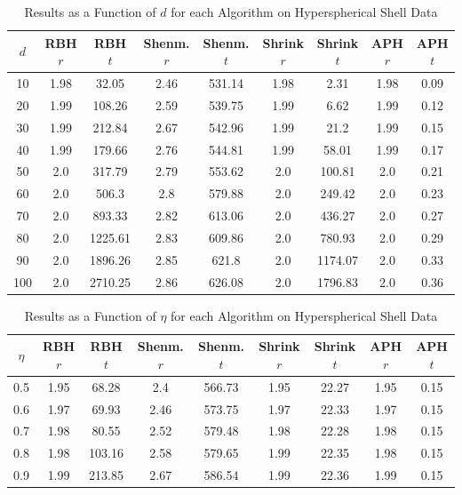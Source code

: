 \documentclass[11pt,twoside]{report}
\theoremstyle{definition}
\numberwithin{theorem}{section}
\numberwithin{definition}{section}
\numberwithin{lemma}{section}
\numberwithin{proposition}{section}
\numberwithin{equation}{section}
\numberwithin{figure}{section}
\begin{document}
\begin{appendices}
    \begin{table}[ht]
        \centering
        \begin{tabular}{|c||c|c||c|c||c|c||c|c|} \hline
            $d$&RBH $r$&RBH $t$&Shenm. $r$&Shenm. $t$&Shrink $r$&Shrink $t$&APH $r$&APH $t$ \\ \hline
            10&1.98&32.05&2.46&531.14&1.98&2.31&1.98&0.09 \\
            20&1.99&108.26&2.59&539.75&1.99&6.62&1.99&0.12 \\
            30&1.99&212.84&2.67&542.96&1.99&21.2&1.99&0.15 \\
            40&1.99&179.66&2.76&544.81&1.99&58.01&1.99&0.17 \\
            50&2.0&317.79&2.79&553.62&2.0&100.81&2.0&0.21 \\
            60&2.0&506.3&2.8&579.88&2.0&249.42&2.0&0.23 \\
            70&2.0&893.33&2.82&613.06&2.0&436.27&2.0&0.27 \\
            80&2.0&1225.61&2.83&609.86&2.0&780.93&2.0&0.29 \\
            90&2.0&1896.26&2.85&621.8&2.0&1174.07&2.0&0.33 \\
            100&2.0&2710.25&2.86&626.08&2.0&1796.83&2.0&0.36 \\ \hline
        \end{tabular}
        \caption{Results as a Function of $d$ for each Algorithm on Hyperspherical Shell Data}
        \label{tab:hyperspherical_shell_table_d}
    \end{table}
    
    \begin{table}[ht]
        \centering
        \begin{tabular}{|c||c|c||c|c||c|c||c|c|} \hline
            $\eta$&RBH $r$&RBH $t$&Shenm. $r$&Shenm. $t$&Shrink $r$&Shrink $t$&APH $r$&APH $t$ \\ \hline
            0.5&1.95&68.28&2.4&566.73&1.95&22.27&1.95&0.15 \\
            0.6&1.97&69.93&2.46&573.75&1.97&22.33&1.97&0.15 \\
            0.7&1.98&80.55&2.52&579.48&1.98&22.28&1.98&0.15 \\
            0.8&1.98&103.16&2.58&579.65&1.99&22.35&1.98&0.15 \\
            0.9&1.99&213.85&2.67&586.54&1.99&22.36&1.99&0.15 \\ \hline
        \end{tabular}
        \caption{Results as a Function of $\eta$ for each Algorithm on Hyperspherical Shell Data}
        \label{tab:hyperspherical_shell_table_eta}
    \end{table}
    \clearpage
    

\end{appendices}
\end{document}
